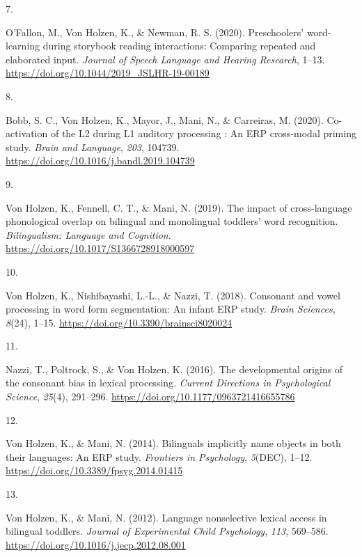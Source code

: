 \documentclass[10pt,a4paper,]{article}
\newlength{\cslhangindent}
\newlength{\csllabelwidth}
\newcommand{\CSLLeftMargin}[1]{\parbox[t]{\csllabelwidth}{\hfill #1~}}
\newcommand{\CSLRightInline}[1]{\parbox[t]{\linewidth - \cslhangindent - \csllabelwidth}{#1}\vspace{0.8ex}}
\begin{document}
\leavevmode{}%
\CSLLeftMargin{7. }%
\CSLRightInline{O'Fallon, M., Von Holzen, K., \& Newman, R. S. (2020).
Preschoolers' word-learning during storybook reading interactions:
Comparing repeated and elaborated input. \emph{Journal of Speech
Language and Hearing Research}, 1--13.
\url{https://doi.org/10.1044/2019_JSLHR-19-00189}}

\leavevmode{}%
\CSLLeftMargin{8. }%
\CSLRightInline{Bobb, S. C., Von Holzen, K., Mayor, J., Mani, N., \&
Carreiras, M. (2020). Co-activation of the L2 during L1 auditory
processing : An ERP cross-modal priming study. \emph{Brain and
Language}, \emph{203}, 104739.
\url{https://doi.org/10.1016/j.bandl.2019.104739}}

\leavevmode{}%
\CSLLeftMargin{9. }%
\CSLRightInline{Von Holzen, K., Fennell, C. T., \& Mani, N. (2019). The
impact of cross-language phonological overlap on bilingual and
monolingual toddlers' word recognition. \emph{Bilingualism: Language and
Cognition}. \url{https://doi.org/10.1017/S1366728918000597}}

\leavevmode{}%
\CSLLeftMargin{10. }%
\CSLRightInline{Von Holzen, K., Nishibayashi, L.-L., \& Nazzi, T.
(2018). Consonant and vowel processing in word form segmentation: An
infant ERP study. \emph{Brain Sciences}, \emph{8}(24), 1--15.
\url{https://doi.org/10.3390/brainsci8020024}}

\leavevmode{}%
\CSLLeftMargin{11. }%
\CSLRightInline{Nazzi, T., Poltrock, S., \& Von Holzen, K. (2016). The
developmental origins of the consonant bias in lexical processing.
\emph{Current Directions in Psychological Science}, \emph{25}(4),
291--296. \url{https://doi.org/10.1177/0963721416655786}}

\leavevmode{}%
\CSLLeftMargin{12. }%
\CSLRightInline{Von Holzen, K., \& Mani, N. (2014). Bilinguals
implicitly name objects in both their languages: An ERP study.
\emph{Frontiers in Psychology}, \emph{5}(DEC), 1--12.
\url{https://doi.org/10.3389/fpsyg.2014.01415}}

\leavevmode{}%
\CSLLeftMargin{13. }%
\CSLRightInline{Von Holzen, K., \& Mani, N. (2012). Language
nonselective lexical access in bilingual toddlers. \emph{Journal of
Experimental Child Psychology}, \emph{113}, 569--586.
\url{https://doi.org/10.1016/j.jecp.2012.08.001}}
\end{document}
